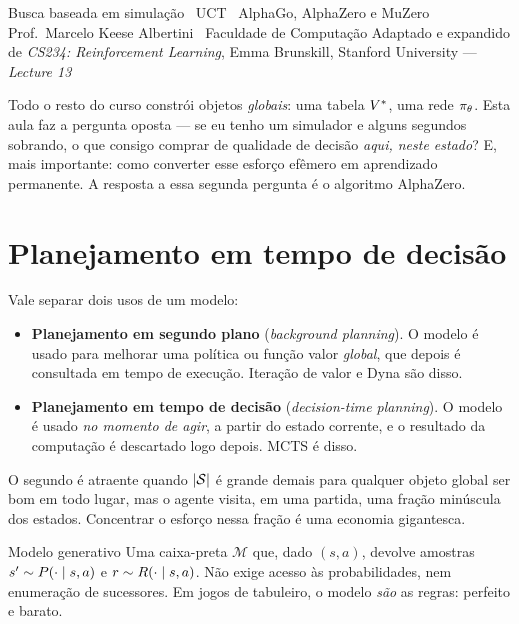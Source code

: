 \documentclass[a4paper, 11pt]{article}
\newcommand{\Mmod}{\mathcal{M}}
\begin{document}
     {Busca baseada em simulação \textbullet\ UCT \textbullet\ AlphaGo, AlphaZero e MuZero}
     {Prof.\ Marcelo Keese Albertini \textbullet\ Faculdade de Computação}
     {Adaptado e expandido de \emph{CS234: Reinforcement Learning}, Emma Brunskill, Stanford University --- \emph{Lecture 13}}

\begin{ideiabox}
Todo o resto do curso constrói objetos \emph{globais}: uma tabela $V^{*}$, uma
rede $\pi_\theta$. Esta aula faz a pergunta oposta --- se eu tenho um simulador
e alguns segundos sobrando, o que consigo comprar de qualidade de decisão
\emph{aqui, neste estado}? E, mais importante: como converter esse esforço
efêmero em aprendizado permanente. A resposta a essa segunda pergunta é o
algoritmo AlphaZero.
\end{ideiabox}

\section{Planejamento em tempo de decisão}

Vale separar dois usos de um modelo:

\begin{itemize}
  \item \textbf{Planejamento em segundo plano} (\emph{background planning}).
        O modelo é usado para melhorar uma política ou função valor
        \emph{global}, que depois é consultada em tempo de execução. Iteração
        de valor e Dyna são disso.
  \item \textbf{Planejamento em tempo de decisão} (\emph{decision-time
        planning}). O modelo é usado \emph{no momento de agir}, a partir do
        estado corrente, e o resultado da computação é descartado logo depois.
        MCTS é disso.
\end{itemize}

O segundo é atraente quando $\lvert\mathcal{S}\rvert$ é grande demais para qualquer objeto
global ser bom em todo lugar, mas o agente visita, em uma partida, uma fração
minúscula dos estados. Concentrar o esforço nessa fração é uma economia
gigantesca.

\begin{defbox}{Modelo generativo}
Uma caixa-preta $\Mmod$ que, dado $(s,a)$, devolve amostras
$s'\sim P(\cdot\mid s,a)$ e $r \sim R(\cdot\mid s,a)$. Não exige acesso às
probabilidades, nem enumeração de sucessores. Em jogos de tabuleiro, o modelo
\emph{são} as regras: perfeito e barato.
\end{defbox}
\end{document}
